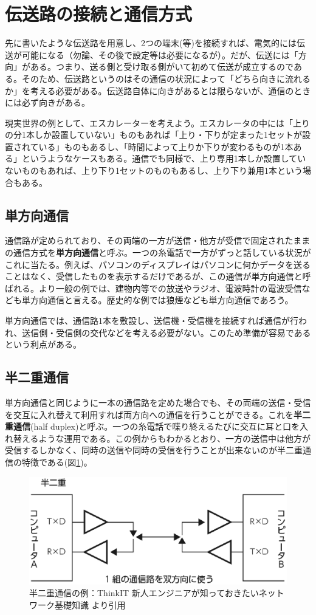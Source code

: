 \section{伝送路の接続と通信方式}
先に書いたような伝送路を用意し、2つの端末(等)を接続すれば、電気的には伝送が可能になる（勿論、その後で設定等は必要になるが）。だが、伝送には「方向」がある。つまり、送る側と受け取る側がいて初めて伝送が成立するのである。そのため、伝送路というのはその通信の状況によって「どちら向きに流れるか」を考える必要がある。伝送路自体に向きがあるとは限らないが、通信のときには必ず向きがある。

現実世界の例として、エスカレーターを考えよう。エスカレータの中には「上りの分1本しか設置していない」ものもあれば「上り・下りが定まった1セットが設置されている」ものもあるし、「時間によって上りか下りが変わるものが1本ある」というようなケースもある。通信でも同様で、上り専用1本しか設置していないものもあれば、上り下り1セットのものもあるし、上り下り兼用1本という場合もある。

\subsection{単方向通信}
通信路が定められており、その両端の一方が送信・他方が受信で固定されたままの通信方式を\textbf{単方向通信}と呼ぶ。一つの糸電話で一方がずっと話している状況がこれに当たる。例えば、パソコンのディスプレイはパソコンに何かデータを送ることはなく、受信したものを表示するだけであるが、この通信が単方向通信と呼ばれる。より一般の例では、建物内等での放送やラジオ、電波時計の電波受信なども単方向通信と言える。歴史的な例では狼煙なども単方向通信であろう。

単方向通信では、通信路1本を敷設し、送信機・受信機を接続すれば通信が行われ、送信側・受信側の交代などを考える必要がない。このため準備が容易であるという利点がある。

\subsection{半二重通信}
単方向通信と同じように一本の通信路を定めた場合でも、その両端の送信・受信を交互に入れ替えて利用すれば両方向への通信を行うことができる。これを\textbf{半二重通信}(half duplex)と呼ぶ。一つの糸電話で喋り終えるたびに交互に耳と口を入れ替えるような運用である。この例からもわかるとおり、一方の送信中は他方が受信するしかなく、同時の送信や同時の受信を行うことが出来ないのが半二重通信の特徴である(図\ref{fig3_1})。

\begin{figure}[htb]
\centering
\includegraphics[width=0.7\linewidth,keepaspectratio]{fig/fig3_1.eps}
\caption{半二重通信の例：ThinkIT 新人エンジニアが知っておきたいネットワーク基礎知識 より引用}\label{fig3_1}
\end{figure}

